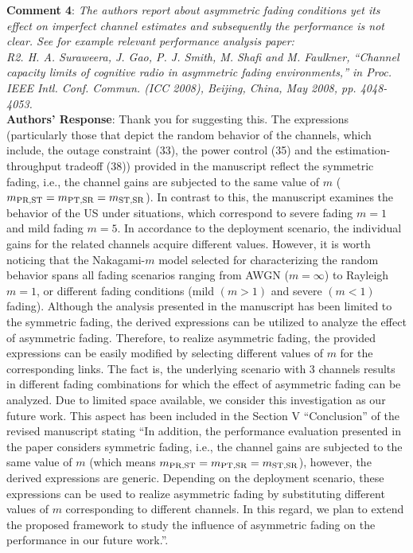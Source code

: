 \documentclass[12pt,a4wide,peerreview]{IEEEtran}
\newcommand{\tc}[1]{#1}
\begin{document}
\textbf{\tc{Comment 4}}: 
\textit{
The authors report about asymmetric fading conditions yet its effect on imperfect channel estimates and subsequently the performance is not clear. See for example relevant performance analysis paper:
\\
R2. H. A. Suraweera, J. Gao, P. J. Smith, M. Shafi and M. Faulkner, ``Channel capacity limits of cognitive radio in asymmetric fading environments,'' in Proc. IEEE Intl. Conf. Commun. (ICC 2008), Beijing, China, May 2008, pp. 4048-4053.
}
\\
\textbf{Authors' Response}: Thank you for suggesting this. The expressions (particularly those that depict the random behavior of the channels, which include, the outage constraint (33), the power control (35) and the estimation-throughput tradeoff (38)) provided in the manuscript reflect the symmetric fading, i.e., the channel gains are subjected to the same value of $m$ ($m_{\text{PR,ST}} = m_{\text{PT,SR}} = m_{\text{ST,SR}}$). In contrast to this, the manuscript examines the behavior of the US under situations, which correspond to severe fading $m = 1$ and mild fading $m = 5$. In accordance to the deployment scenario, the individual gains for the related channels acquire different values. However, it is worth noticing that the Nakagami-$m$ model selected for characterizing the random behavior spans all fading scenarios ranging from AWGN ($m = \infty$) to Rayleigh $m = 1$, or different fading conditions (mild $(m > 1)$ and severe $(m < 1)$ fading). Although the analysis presented in the manuscript has been limited to the symmetric fading, the derived expressions can be utilized to analyze the effect of asymmetric fading. Therefore, to realize asymmetric fading, the provided expressions can be easily modified by selecting different values of $m$ for the corresponding links. The fact is, the underlying scenario with 3 channels results in different fading combinations for which the effect of asymmetric fading can be analyzed. Due to limited space available, we consider this investigation as our future work. This aspect has been included in the Section V ``Conclusion'' of the revised manuscript stating ``In addition, the performance evaluation presented in the paper considers symmetric fading, i.e., the channel gains are subjected to the same value of $m$ (which means $m_{\text{PR,ST}} = m_{\text{PT,SR}} = m_{\text{ST,SR}}$), however, the derived expressions are generic. Depending on the deployment scenario, these expressions can be used to realize asymmetric fading by substituting different values of $m$ corresponding to different channels. In this regard, we plan to extend the proposed framework to study the influence of asymmetric fading on the performance in our future work.''. 
\end{document}
